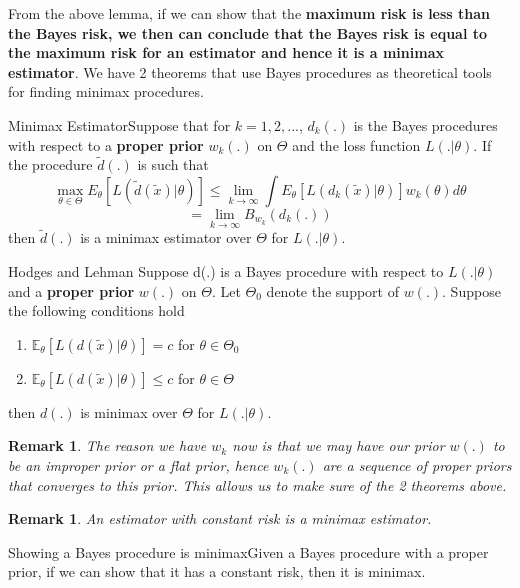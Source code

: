 \documentclass[twoside]{article}
\newtheorem{remark}[theorem]{Remark}
\begin{document}
From the above lemma, if we can show that the \textbf{maximum risk is less than the Bayes risk, we then can conclude that the Bayes risk is equal to the maximum risk for an estimator and hence it is a minimax estimator}. We have 2 theorems that use Bayes procedures as theoretical tools for finding minimax procedures.

\begin{theorem_exam}{Minimax Estimator}{}Suppose that for $k=1,2,...$, $d_k(.)$ is the Bayes procedures with respect to a \textbf{proper prior} $w_k(.)$ on $\Theta$ and the loss function $L(.|\theta).$ If the procedure $\tilde{d}(.)$ is such that 
$$
\max_{\theta \in \Theta}E_{\theta}[L(\tilde{d}(\tilde{x})|\theta)] \leq \lim_{k \rightarrow \infty}\int E_{\theta}[L(d_k(\tilde{x})|\theta)]w_k(\theta)d\theta 
$$
$$
= \lim_{k \rightarrow \infty}B_{w_{k}}(d_k(.))
$$
then $\tilde{d}(.)$ is a minimax estimator over $\Theta$ for $L(.|\theta).$
\end{theorem_exam}


\begin{theorem_exam}{Hodges and Lehman}{} Suppose d(.) is a Bayes procedure with respect to $L(.|\theta)$ and a \textbf{proper prior} $w(.)$ on $\Theta.$ Let $\Theta_0$ denote the support of $w(.).$ Suppose the following conditions hold 
\begin{enumerate}
\item $\mathbb{E}_{\theta}[L(d(\tilde{x})|\theta)] = c$ for $\theta \in \Theta_0$
\item $\mathbb{E}_{\theta}[L(d(\tilde{x})|\theta)] \leq c$ for $\theta \in \Theta$
\end{enumerate}
then $d(.)$ is minimax over $\Theta$ for $L(.|\theta).$
\end{theorem_exam}


\begin{remark}The reason we have $w_k$ now is that we may have our prior $w(.)$ to be an improper prior or a flat prior, hence $w_k(.)$ are a sequence of proper priors that converges to this prior. This allows us to make sure of the 2 theorems above.
\end{remark}

\begin{remark}An estimator with constant risk is a minimax estimator.
\end{remark}

\begin{proposition_exam}{Showing a Bayes procedure is minimax}{}Given a Bayes procedure with a proper prior, if we can show that it has a constant risk, then it is minimax.
\end{proposition_exam}
\end{document}
